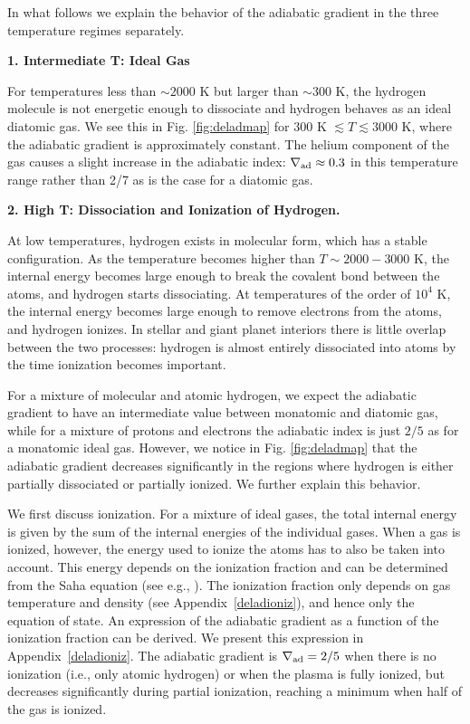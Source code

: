 \documentclass[apj]{emulateapj}
\newcommand{\delad}{\nabla_{\rm ad}}
\newcommand{\App}[1]{Appendix~\ref{#1}}
\begin{document}
In what follows we explain the behavior of the adiabatic gradient in the three temperature regimes separately.

\vspace{0.2in}

\textbf{1. Intermediate T: Ideal Gas}

For temperatures less than $\sim 2000$ K but larger than $\sim 300$ K, the hydrogen molecule is not energetic enough to dissociate and hydrogen behaves as an ideal diatomic gas. We see this in Fig. \ref{fig:deladmap} for 300 K $\lesssim T \lesssim 3000$ K, where the adiabatic gradient is approximately constant. The helium component of the gas causes a slight increase in the adiabatic index: $\delad \approx 0.3$ in this temperature range rather than 2/7 as is the case for a diatomic gas.

\vspace{0.2in}

\textbf{2. High T: Dissociation and Ionization of Hydrogen.}

At low temperatures, hydrogen exists in molecular form, which has a stable configuration. As the temperature becomes higher than $T \sim 2000-3000$ K, the internal energy becomes large enough to break the covalent bond between the atoms, and hydrogen starts dissociating. At temperatures of the order of $10^4$ K, the internal energy becomes large enough to remove electrons from the atoms, and hydrogen ionizes. In stellar and giant planet interiors there is little overlap between the two processes: hydrogen is almost entirely dissociated into atoms by the time ionization becomes important. 

For a mixture of molecular and atomic hydrogen, we expect the adiabatic gradient to have an intermediate value between monatomic and diatomic gas, while for a mixture of protons and electrons the adiabatic index is just $2/5$ as for a monatomic ideal gas. However, we notice in Fig. \ref{fig:deladmap} that the adiabatic gradient decreases significantly in the regions where hydrogen is either partially dissociated or partially ionized. We further explain this behavior.

We first discuss ionization. For a mixture of ideal gases, the total internal energy is given by the sum of the internal energies of the individual gases. When a gas is ionized, however, the energy used to ionize the atoms has to also be taken into account. This energy depends on the ionization fraction and can be determined from the Saha equation (see e.g., \citealt{kippenhahn90}). The ionization fraction only depends on gas temperature and density (see \App{deladioniz}), and hence only the equation of state. An expression of the adiabatic gradient as a function of the ionization fraction can be derived. We present this expression in \App{deladioniz}. The adiabatic gradient is $\delad=2/5$ when there is no ionization (i.e., only atomic hydrogen) or when the plasma is fully ionized, but decreases significantly during partial ionization, reaching a minimum when half of the gas is ionized. 
\end{document}

